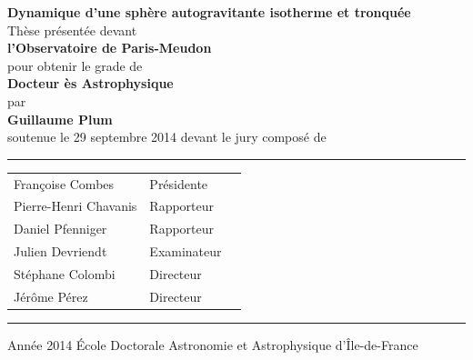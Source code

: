 \begin{titlepage}
	\begin{center}
		\begin{minipage}{\plarg}
			\vspace{2cm} \centering
			{\huge\bfseries Dynamique d'une sphère autogravitante isotherme et tronquée }\\ \vspace{1cm}
			Thèse présentée devant\\ \vspace{2mm}
			{\large\bfseries l'Observatoire de Paris-Meudon}\\ \vspace{1cm}
			pour obtenir le grade de \\ \vspace{2mm}
			{\large\bfseries Docteur ès Astrophysique}\\ \vspace{1cm}
			par \\ \vspace{2mm}
			{\large\bfseries Guillaume Plum}\\ \vspace{1cm}
			soutenue le 29 septembre 2014 devant le jury composé de \vspace{2mm}
			{\rule{\plarg}{1pt}} \vspace{3mm}
			\begin{tabular}{p{5cm}p{5cm}p{4cm}}
				\vfill Françoise Combes & \vfill Présidente \\
				Pierre-Henri Chavanis & Rapporteur \\
				Daniel Pfenniger & Rapporteur \\
				Julien Devriendt & Examinateur \\
				Stéphane Colombi & Directeur \\
				Jérôme Pérez & Directeur
			\end{tabular}
		\end{minipage}
	\end{center}

	\vfill \hspace{-1cm}
	\begin{minipage}{\glarg}
		{\rule{\glarg}{1pt}}
		Année 2014 \hfill École Doctorale Astronomie et Astrophysique d'Île-de-France
	\end{minipage}
\end{titlepage}
